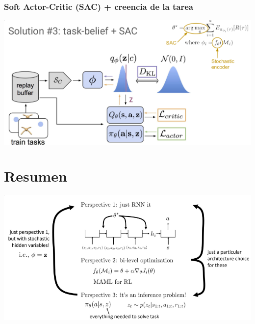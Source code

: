 \subsubsection{Soft Actor-Critic (SAC) + creencia de la tarea}%
\label{ssub:soft_actor_critic_sac_}

\begin{center}
\includegraphics[width=.7\textwidth]{figures/2020-07-25-200536_1023x516_scrot.png}
\end{center}

\section{Resumen}%
\label{sec:resumen}

\begin{center}
\includegraphics[width=.7\textwidth]{figures/2020-07-25-200918_910x460_scrot.png}
\end{center}

